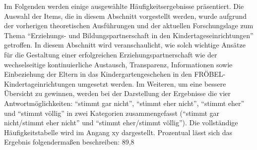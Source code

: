 \documentclass[12pt,a4paper]{article}
\begin{document}
Im Folgenden werden einige ausgewählte Häufigkeitsergebnisse präsentiert. Die Auswahl der Items, die in diesem Abschnitt vorgestellt werden, wurde aufgrund der vorherigen theoretischen Ausführungen und der aktuellen Forschungslage zum Thema "`Erziehungs- und Bildungspartnerschaft in den Kindertageseinrichtungen"' getroffen. In diesem Abschnitt wird veranschaulicht, wie solch wichtige Ansätze für die Gestaltung einer erfolgreichen Erziehungspartnerschaft wie der wechselseitige kontinuierliche Austausch, Transparenz, Informationen sowie Einbeziehung der Eltern in das Kindergartengeschehen in den FRÖBEL-Kindertageinrichtungen umgesetzt werden. 
	Im Weiteren, um eine bessere Übersicht zu gewinnen, werden bei der Darstellung der Ergebnisse die vier Antwortmöglichkeiten: "`stimmt gar nicht"', "`stimmt eher nicht"', "`stimmt eher"' und "`stimmt völlig"' in zwei Kategorien zusammengefasst ("`stimmt gar nicht/stimmt eher nicht"' und "`stimmt eher/stimmt völlig"'). Die vollständige Häufigkeitstabelle wird im Angang xy dargestellt.
	Prozentual lässt sich das Ergebnis folgendermaßen beschreiben: 89,8%
\end{document}

